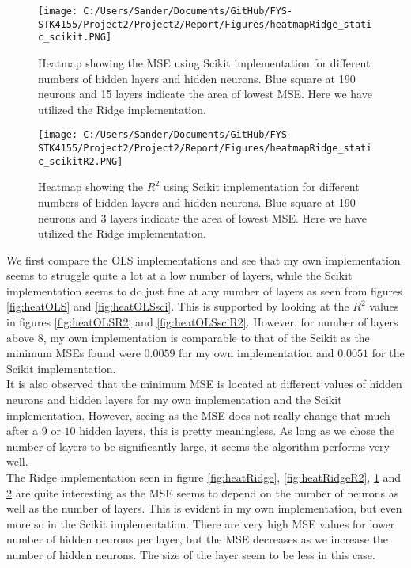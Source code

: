\documentclass[12pt,a4paper]{article}
\begin{document}
\begin{figure}[H]
\centering
\texttt{[image: C:/Users/Sander/Documents/GitHub/FYS-STK4155/Project2/Project2/Report/Figures/heatmapRidge\_static\_scikit.PNG]}
\caption{\label{fig:heatRidgesci} Heatmap showing the MSE using Scikit implementation for different numbers of hidden layers and hidden neurons. Blue square at 190 neurons and 15 layers indicate the area of lowest MSE. Here we have utilized the Ridge implementation.}
\end{figure}

\begin{figure}[H]
\centering
\texttt{[image: C:/Users/Sander/Documents/GitHub/FYS-STK4155/Project2/Project2/Report/Figures/heatmapRidge\_static\_scikitR2.PNG]}
\caption{\label{fig:heatRidgesciR2} Heatmap showing the $R^2$ using Scikit implementation for different numbers of hidden layers and hidden neurons. Blue square at 190 neurons and 3 layers indicate the area of lowest MSE. Here we have utilized the Ridge implementation.}
\end{figure}

\noindent We first compare the OLS implementations and see that my own implementation seems to struggle quite a lot at a low number of layers, while the Scikit implementation seems to do just fine at any number of layers as seen from figures \ref{fig:heatOLS} and \ref{fig:heatOLSsci}. This is supported by looking at the $R^2$ values in figures \ref{fig:heatOLSR2} and \ref{fig:heatOLSsciR2}. However, for number of layers above 8, my own implementation is comparable to that of the Scikit as the minimum MSEs found were $0.0059$ for my own implementation and $0.0051$ for the Scikit implementation. 
\\
It is also observed that the minimum MSE is located at different values of hidden neurons and hidden layers for my own implementation and the Scikit implementation. However, seeing as the MSE does not really change that much after a $9$ or $10$ hidden layers, this is pretty meaningless. As long as we chose the number of layers to be significantly large, it seems the algorithm performs very well.
\\
The Ridge implementation seen in figure \ref{fig:heatRidge}, \ref{fig:heatRidgeR2}, \ref{fig:heatRidgesci} and \ref{fig:heatRidgesciR2} are quite interesting as the MSE seems to depend on the number of neurons as well as the number of layers. This is evident in my own implementation, but even more so in the Scikit implementation. There are very high MSE values for lower number of hidden neurons per layer, but the MSE decreases as we increase the number of hidden neurons. The size of the layer seem to be less in this case.
\end{document}
